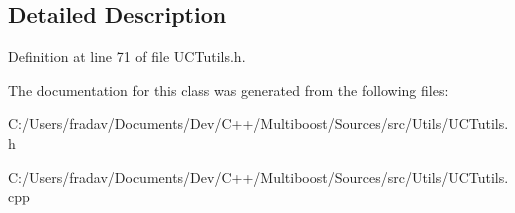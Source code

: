 \subsection{Detailed Description}


Definition at line 71 of file U\-C\-Tutils.\-h.



The documentation for this class was generated from the following files\-:\begin{DoxyCompactItemize}
\item 
C\-:/\-Users/fradav/\-Documents/\-Dev/\-C++/\-Multiboost/\-Sources/src/\-Utils/U\-C\-Tutils.\-h\item 
C\-:/\-Users/fradav/\-Documents/\-Dev/\-C++/\-Multiboost/\-Sources/src/\-Utils/U\-C\-Tutils.\-cpp\end{DoxyCompactItemize}
